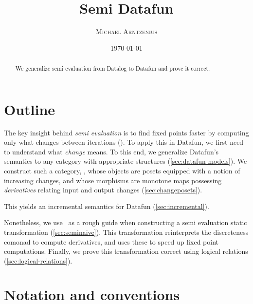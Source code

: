 \title{Semi\naive{} Datafun}
\author{\scshape Michael Arntzenius}
\date{\today}

\maketitle

\begin{abstract}
  We generalize semi\naive{} evaluation from Datalog to Datafun and prove it
  correct.
\end{abstract}

\section{Outline}

The key insight behind \emph{semi\naive{} evaluation} is to find fixed points
faster by computing only what changes between iterations
(). To apply this in Datafun, we first need to
understand what \emph{change} means.
%
To this end, we generalize Datafun's \Poset{} semantics to any category with
appropriate structures (\cref{sec:datafun-models}). We construct such a
category, \CP{}, whose objects are posets equipped with a notion of increasing
changes, and whose morphisms are monotone maps possessing \emph{derivatives}
relating input and output changes (\cref{sec:changeposets}).

This yields an incremental semantics for Datafun (\cref{sec:incremental}).
%

Nonetheless, we use \CP\ as a rough guide when constructing a semi\naive{}
evaluation static transformation (\cref{sec:seminaive}). This transformation
reinterprets the discreteness comonad to compute derivatives, and uses these to
speed up fixed point computations. Finally, we prove this transformation correct
using logical relations (\cref{sec:logical-relations}).



\section{Notation and conventions}

